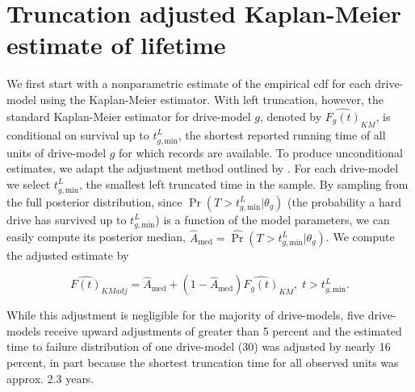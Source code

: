 \documentclass[aoas]{imsart}
\begin{document}
\clearpage

\appendix
\section{Truncation adjusted Kaplan-Meier estimate of lifetime}
\label{sec:trunc-adj}
We first start with a nonparametric estimate of the empirical cdf for each drive-model using the Kaplan-Meier estimator.  With left truncation, however, the standard Kaplan-Meier estimator for drive-model $g$, denoted by
$\widehat{F_g(t)}_{KM}$, is conditional on survival up to
$t_{g,\text{min}}^L$, the shortest reported running time of all units
of drive-model $g$ for which records are available. To produce
unconditional estimates, we adapt the adjustment method outlined by \citet[Chapter 11]{meeker}.  For each drive-model we select
$t_{g,\text{min}}^L$, the smallest left truncated time in the sample.
By sampling from the full posterior distribution, since
$\Pr(T>t_{g,\text{min}}^L|\theta_g)$ (the probability a hard drive has
survived up to $t_{g,\text{min}}^L$) is a function of the model
parameters, we can easily compute its posterior median,
$\widehat{A}_{\text{med}} = \widehat{\Pr}(T>t_{g,\text{min}}^L|\theta_g)$. We compute the adjusted estimate by

$$\widehat{F(t)}_{KMadj} = \widehat{A}_{\text{med}} + \left(1 - \widehat{A}_{\text{med}}\right)\widehat{F_g(t)}_{KM},\; t>t_{g,\text{min}}^L.$$

While this adjustment is negligible for the majority of drive-models, five drive-models receive upward adjustments of greater than 5 percent and the estimated time to failure distribution of one drive-model (30) was adjusted by nearly 16 percent, in part because the shortest truncation time for all observed units was approx. 2.3 years.
\end{document}
